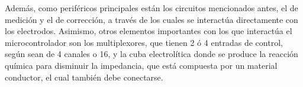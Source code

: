 Además, como periféricos principales están los circuitos mencionados antes, el de medición y el de corrección, a través de los cuales se interactúa directamente con los electrodos. Asimismo, otros elementos importantes con los que interactúa el microcontrolador son los multiplexores, que tienen 2 ó 4 entradas de control, según sean de 4 canales o 16, y la cuba electrolítica donde se produce la reacción química para disminuir la impedancia, que está compuesta por un material conductor, el cual también debe conectarse.



\pagebreak

